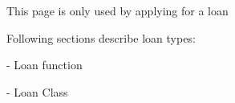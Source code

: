 
\begin{DoxyItemize}
\item This page is only used by applying for a loan
\item Following sections describe loan types\+:
\item -\/ Loan function
\item -\/ Loan Class 
\end{DoxyItemize}